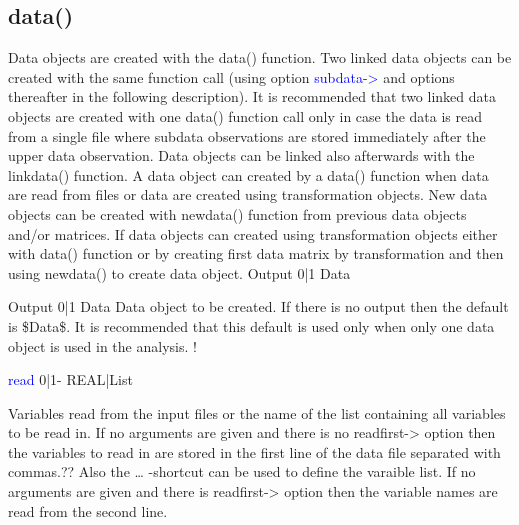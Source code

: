 \subsection{\textcolor{VioletRed}{data}()}
\label{data}
Data objects are created with the \textcolor{VioletRed}{data}() function. Two linked data objects can be created with the
same function call (using option \textcolor{blue}{subdata->} and options thereafter in the following
description). It is recommended that two linked data objects are created with one \textcolor{VioletRed}{data}()
function call only in case the data is read from a single file where subdata observations are
stored immediately after the upper data observation.  Data objects can be linked also afterwards with the \textcolor{VioletRed}{linkdata}() function.
A data object can created by a \textcolor{VioletRed}{data}() function when data are read from files
or data are created using transformation objects. New data objects can
be created with \textcolor{VioletRed}{newdata}() function from previous data objects and/or matrices.
If data objects can created using transformation objects either with \textcolor{VioletRed}{data}() function
or by creating first data matrix by transformation and then using \textcolor{VioletRed}{newdata}() to
create data object.
\vspace{0.3cm}
\hline
\vspace{0.3cm}
\noindent Output  \tabto{3cm} 0|1 \tabto{5cm}  Data \tabto{7cm}
\begin{changemargin}{3cm}{0cm}
\noindent \noindent Output  \tabto{3cm} 0|1 \tabto{5cm}  Data \tabto{7cm}
Data object to be created. If there is no output then the default is \$Data\$.
It is recommended that this default is used only when only one data object
is used in the analysis.
!
\end{changemargin}
\vspace{0.3cm}
\hline
\vspace{0.3cm}
\noindent \textcolor{blue}{read}  \tabto{3cm} 0|1- \tabto{5cm}  REAL|List \tabto{7cm}
\begin{changemargin}{3cm}{0cm}
\noindent  Variables read from the input files or the name of the list containing all variables
to be read in. If no arguments are given and there is no readfirst-> option
then the variables to read in are stored in the first line of the data file separated
with commas.?? Also the … -shortcut can be used to define the varaible list. If no arguments are given and
there is readfirst-> option then the variable names are read from the second
line.
\end{changemargin}
